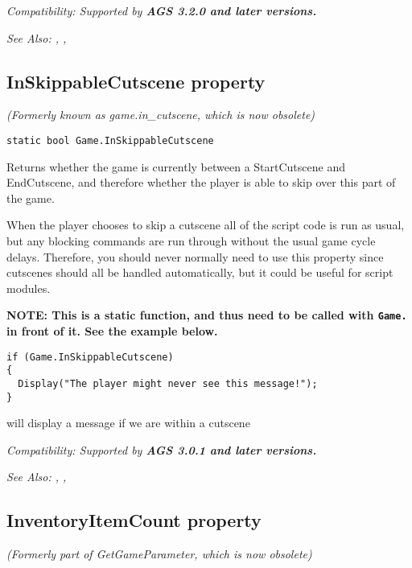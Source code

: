 \it{Compatibility:} Supported by \bf{AGS 3.2.0} and later versions.

\it{See Also:} ,
, 


\subsection{InSkippableCutscene property}\label{Game.InSkippableCutscene}%

\it{(Formerly known as game.in_cutscene, which is now obsolete)}

\begin{verbatim}
static bool Game.InSkippableCutscene
\end{verbatim}
Returns whether the game is currently between a StartCutscene and EndCutscene, and therefore
whether the player is able to skip over this part of the game.

When the player chooses to skip a cutscene all of the script code is run as usual,
but any blocking commands are run through without the usual game cycle delays. Therefore, you
should never normally need to use this property since cutscenes should all be handled automatically,
but it could be useful for script modules.

\bf{NOTE:} This is a static function, and thus need to be called with \verb$Game.$ in front of it. See
the example below.

\begin{verbatim}
if (Game.InSkippableCutscene)
{
  Display("The player might never see this message!");
}
\end{verbatim}
will display a message if we are within a cutscene

\it{Compatibility:} Supported by \bf{AGS 3.0.1} and later versions.

\it{See Also:} , ,


\subsection{InventoryItemCount property}\label{Game.InventoryItemCount}%

\it{(Formerly part of GetGameParameter, which is now obsolete)}

